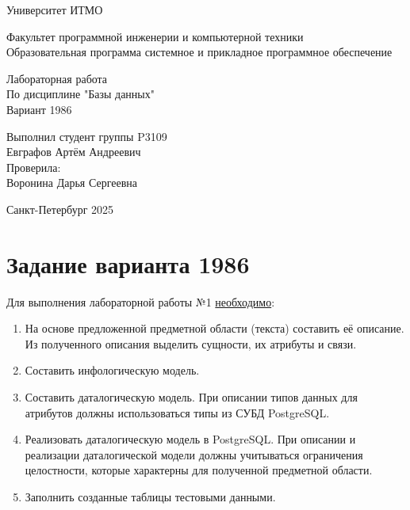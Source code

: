 

\thispagestyle{empty}
\begin{center}
\LARGE{Университет ИТМО} 
\vspace{20pt}

\LARGE{Факультет программной инженерии и компьютерной техники \\
Образовательная программа системное и прикладное программное обеспечение}
\vspace{160pt}

\LARGE{Лабораторная работа   \\
По дисциплине "Базы данных" \\ 
Вариант 1986}
\vspace{120pt}
\end{center}

\begin{flushright}
\LARGE{Выполнил студент группы P3109 \\ 
Евграфов Артём Андреевич \\
Проверила: \\
Воронина Дарья Сергеевна}
\vspace{120pt}
\end{flushright}

\begin{center}
\Large{Санкт-Петербург 2025}
\end{center}

\newpage
\setcounter{page}{1}
\tableofcontents
\newpage
\section{Задание варианта 1986}
Для выполнения лабораторной работы №1 \underline{необходимо}:
\begin{enumerate}
    \item На основе предложенной предметной области (текста) составить её описание. Из полученного
    описания выделить сущности, их атрибуты и связи.
    \item Составить инфологическую модель.
    \item Составить даталогическую модель. При описании типов данных для атрибутов должны использоваться типы из СУБД PostgreSQL.
    \item  Реализовать даталогическую модель в PostgreSQL. При описании и реализации даталогической модели должны учитываться ограничения целостности, которые характерны для полученной предметной  области.
    \item Заполнить созданные таблицы тестовыми данными.
\end{enumerate}

